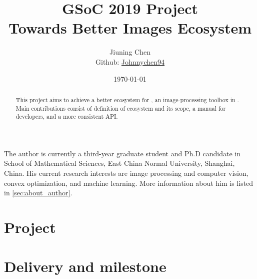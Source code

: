 \documentclass[12pt, a4paper]{article}
\title{GSoC 2019 Project\\Towards Better Images Ecosystem}
\author{Jiuning Chen\mailto{johnnychen94@hotmail.com}\\
Github: \href{https://github.com/johnnychen94}{Johnnychen94}}
\date{\today}
\begin{document}
\maketitle

\renewcommand\abstractname{Abstract}
\begin{abstract}
    This project aims to achieve a better ecosystem for \href{https://juliaimages.org/latest/}{\images}, an image-processing toolbox in \href{https://julialang.org/}{\langjulia}. Main contributions consist of definition of \images ecosystem and its scope, a manual for developers, and a more consistent API.
\end{abstract}

\noindent The author is currently a third-year graduate student and Ph.D candidate in School of Mathematical Sciences, East China Normal University, Shanghai, China. His current research interests are image processing and computer vision, convex optimization, and machine learning. More information about him is listed in \cref{sec:about_author}.\par

\section{Project}

\section{Delivery and milestone}


\end{document}
